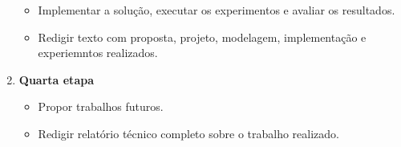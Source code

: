 \documentclass[a4paper,onecolumn, 10pt]{article}
\begin{document}
\begin{enumerate}
\begin{itemize}
  \item Implementar a solução, executar os experimentos e avaliar os resultados.
  \item Redigir texto com proposta, projeto, modelagem, implementação e experiemntos  realizados.
\end{itemize}
\item {\bf Quarta etapa} %
\begin{itemize}
  \item Propor trabalhos futuros.
  \item Redigir relatório técnico completo sobre o trabalho realizado. 
\end{itemize}
\end{enumerate}

\end{document}
